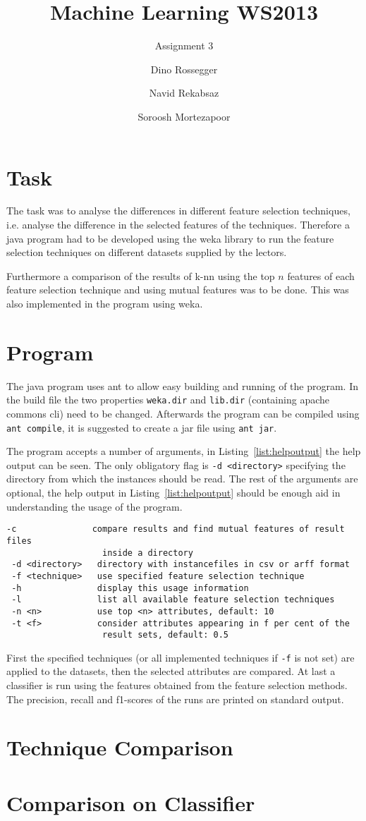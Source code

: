 \documentclass[a4paper,oneside,parskip=half]{scrartcl}
\title{Machine Learning WS2013}
\subtitle{Assignment 3 \\[0.8cm] {\rmfamily\normalfont\Large}}
\author[1]{Dino Rossegger}
\author[2]{Navid Rekabsaz}
\author[3]{Soroosh Mortezapoor}
\affil[1]{e0926471@student.tuwien.ac.at}
\affil[2]{e1129057@student.tuwien.ac.at}
\affil[3]{soroosh.mortezapoor@student.tuwien.ac.at}
\begin{document}
\maketitle
\begin{abstract}
\end{abstract}

\section{Task}
The task was to analyse the differences in different feature selection techniques, i.e. analyse the difference in the selected features of the techniques. Therefore a java program had to be developed using the weka library to run the feature selection techniques on different datasets supplied by the lectors.

Furthermore a comparison of the results of k-nn using the top $n$ features of each feature selection technique and using mutual features was to be done. This was also implemented in the program using weka.

\section{Program}
The java program uses ant to allow easy building and running of the program. In the build file the two properties \lstinline$weka.dir$ and \lstinline$lib.dir$ (containing apache commons cli) need to be changed.
Afterwards the program can be compiled using \lstinline$ant compile$, it is suggested to create a jar file using \lstinline$ant jar$.

The program accepts a number of arguments, in Listing~\ref{list:helpoutput} the help output can be seen. The only obligatory flag is \lstinline$-d <directory>$ specifying the directory from which the instances should be read. The rest of the arguments are optional, the help output in Listing~\ref{list:helpoutput} should be enough aid in understanding the usage of the program.
\begin{lstlisting}[caption=help output of the program, label=list:helpoutput]
 -c               compare results and find mutual features of result files
                   inside a directory
 -d <directory>   directory with instancefiles in csv or arff format
 -f <technique>   use specified feature selection technique
 -h               display this usage information
 -l               list all available feature selection techniques
 -n <n>           use top <n> attributes, default: 10
 -t <f>           consider attributes appearing in f per cent of the
                   result sets, default: 0.5

\end{lstlisting}
First the specified techniques (or all implemented techniques if \lstinline$-f$ is not set) are applied to the datasets, then the selected attributes are compared. At last a classifier is run using the features obtained from the feature selection methods. The precision, recall and f1-scores of the runs are printed on standard output.

\section{Technique Comparison}
\section{Comparison on Classifier}
\end{document}
